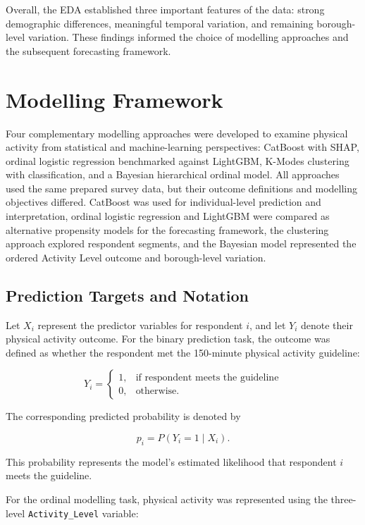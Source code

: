 \documentclass[ %
                    author={Ashrey Ashrey, Sanya Kapoor, Trisha Sharma, Yash Bhooshan Pandloskar},
                supervisor={Dr. Dalila O’Grady},
                    degree={MSc},
                     title={Using machine learning to forecast physical activity participation, volunteering and activity patterns in London},
                  subtitle={},
                      type={},
                      year={2021}]{dissertation}
\begin{document}
Overall, the EDA established three important features of the data: strong demographic differences, meaningful temporal variation, and remaining borough-level variation. These findings informed the choice of modelling approaches and the subsequent forecasting framework.

\FloatBarrier
\section{Modelling Framework}

\noindent
Four complementary modelling approaches were developed to examine physical activity from statistical and machine-learning perspectives: CatBoost with SHAP, ordinal logistic regression benchmarked against LightGBM, K-Modes clustering with classification, and a Bayesian hierarchical ordinal model. All approaches used the same prepared survey data, but their outcome definitions and modelling objectives differed. CatBoost was used for individual-level prediction and interpretation, ordinal logistic regression and LightGBM were compared as alternative propensity models for the forecasting framework, the clustering approach explored respondent segments, and the Bayesian model represented the ordered Activity Level outcome and borough-level variation.

\FloatBarrier
\subsection{Prediction Targets and Notation}

\noindent
Let \(X_i\) represent the predictor variables for respondent \(i\), and let \(Y_i\) denote their physical activity outcome. For the binary prediction task, the outcome was defined as whether the respondent met the 150-minute physical activity guideline:

\[
Y_i =
\begin{cases}
1, & \text{if respondent meets the guideline} \\
0, & \text{otherwise}.
\end{cases}
\]

The corresponding predicted probability is denoted by

\[
p_i = P(Y_i = 1 \mid X_i).
\]

This probability represents the model's estimated likelihood that respondent \(i\) meets the guideline.

For the ordinal modelling task, physical activity was represented using the three-level \texttt{Activity\_Level} variable:
\end{document}
